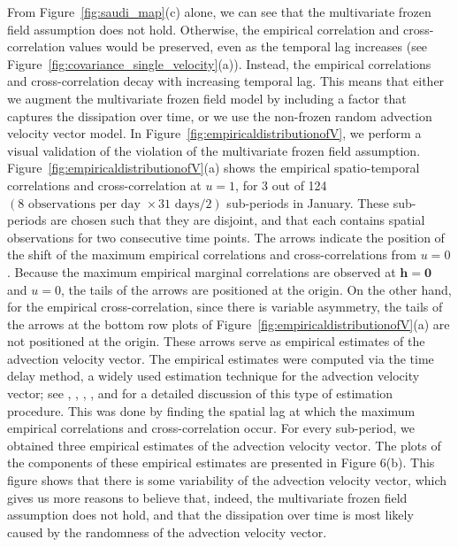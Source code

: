 \documentclass[12pt]{article}
\newcommand{\0}{\mathbf{0}}
\begin{document}
From Figure~\ref{fig:saudi_map}(c) alone, we can see that the multivariate frozen field assumption does not hold. Otherwise, the empirical correlation and cross-correlation values would be preserved, even as the temporal lag increases (see Figure~\ref{fig:covariance_single_velocity}(a)). Instead, the empirical correlations and cross-correlation decay with increasing temporal lag. This means that either we augment the multivariate frozen field model by including a factor that captures the dissipation over time, or we use the non-frozen random advection velocity vector model. In Figure~\ref{fig:empiricaldistributionofV}, we perform a visual validation of the violation of the multivariate frozen field assumption. Figure~\ref{fig:empiricaldistributionofV}(a) shows the empirical spatio-temporal correlations and cross-correlation at $u=1$, for 3 out of 124 $(8 \text{ observations per day } \times 31 \text{ days} / 2)$ sub-periods in January. These sub-periods are chosen such that they are disjoint, and that each contains spatial observations for two consecutive time points. The arrows indicate the position of the shift of the maximum empirical correlations and cross-correlations from $u=0$. Because the maximum empirical marginal correlations are observed at $\mathbf{h}=\mathbf{0}$ and $u=0$, the tails of the arrows are positioned at the origin. On the other hand, for the empirical cross-correlation, since there is variable asymmetry, the tails of the arrows at the bottom row plots of Figure~\ref{fig:empiricaldistributionofV}(a) are not positioned at the origin. These arrows serve as empirical estimates of the advection velocity vector. The empirical estimates were computed via the time delay method, a widely used estimation technique for the advection velocity vector; see \citet{seed1999space}, \citet{inoue2012spatio}, \citet{li2009statistical}, \citet{jamaly2018robust}, and \citet{russo2018spatial} for a detailed discussion of this type of estimation procedure. This was done by finding the spatial lag at which the maximum empirical correlations and cross-correlation occur. For every sub-period, we obtained three empirical estimates of the advection velocity vector. The plots of the components of these empirical estimates are presented in Figure 6(b). This figure shows that there is some variability of the advection velocity vector, which gives us more reasons to believe that, indeed, the multivariate frozen field assumption does not hold, and that the dissipation over time is most likely caused by the randomness of the advection velocity vector.
\end{document}
